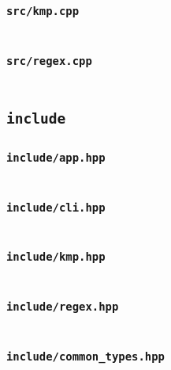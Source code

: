 \documentclass[12pt, a4paper]{ctexart}
\begin{document}
\subsubsection{\texttt{src/kmp.cpp}}
\inputminted{cpp}{../finder/src/kmp.cpp}

\subsubsection{\texttt{src/regex.cpp}}
\inputminted{cpp}{../finder/src/regex.cpp}

\subsection{\texttt{include}}

\subsubsection{\texttt{include/app.hpp}}
\inputminted{cpp}{../finder/include/app.hpp}

\subsubsection{\texttt{include/cli.hpp}}
\inputminted{cpp}{../finder/include/cli.hpp}

\subsubsection{\texttt{include/kmp.hpp}}
\inputminted{cpp}{../finder/include/kmp.hpp}

\subsubsection{\texttt{include/regex.hpp}}
\inputminted{cpp}{../finder/include/regex.hpp}

\subsubsection{\texttt{include/common_types.hpp}}
\inputminted{cpp}{../finder/include/common_types.hpp}
\end{document}
